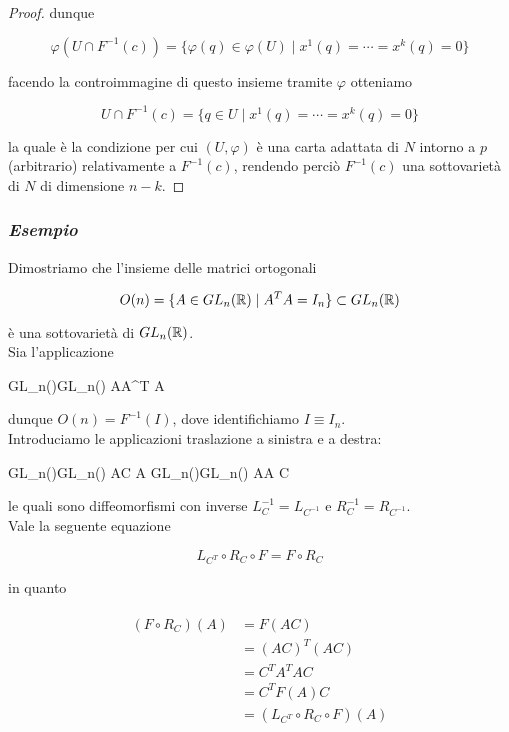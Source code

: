 \begin{proof}
	dunque
	
	\begin{equation}
		\varphi( U \cap F^{-1}(c) ) = \{ \varphi(q) \in \varphi(U) \mid x^{1}(q) = \cdots = x^{k}(q) = 0 \}
	\end{equation}

	facendo la controimmagine di questo insieme tramite $ \varphi $ otteniamo
	
	\begin{equation}
		U \cap F^{-1}(c) = \{ q \in U \mid x^{1}(q) = \cdots = x^{k}(q) = 0 \}
	\end{equation}

	la quale è la condizione per cui $ (U,\varphi) $ è una carta adattata di $ N $ intorno a $ p $ (arbitrario) relativamente a $ F^{-1}(c) $, rendendo perciò $ F^{-1}(c) $ una sottovarietà di $ N $ di dimensione $ n-k $.
\end{proof}

\subsubsection{\textit{Esempio}}

Dimostriamo che l'insieme delle matrici ortogonali

\begin{equation}
	O(n) = \{ A \in GL_{n}(\mathbb{R}) \mid A^{T} A = I_{n} \} \subset GL_{n}(\mathbb{R})
\end{equation}

è una sottovarietà di $ GL_{n}(\mathbb{R}) $. \\
Sia l'applicazione

	{GL_{n}(\R)}{GL_{n}(\R)}
	{A}{A^{T} A}

dunque $ O(n) = F^{-1}(I) $, dove identifichiamo $ I \equiv I_{n} $. \\
Introduciamo le applicazioni traslazione a sinistra e a destra:

	{GL_{n}(\R)}{GL_{n}(\R)}
	{A}{C A}
%
	{GL_{n}(\R)}{GL_{n}(\R)}
	{A}{A C}

le quali sono diffeomorfismi con inverse $ L_{C}^{-1} = L_{C^{-1}} $ e $ R_{C}^{-1} = R_{C^{-1}} $. \\
Vale la seguente equazione

\begin{equation}
	L_{C^{T}} \circ R_{C} \circ F = F \circ R_{C}
\end{equation}

in quanto

\begin{align}
	\begin{split}
		(F \circ R_{C})(A) &= F(AC) \\
		&= (AC)^{T} (AC) \\
		&= C^{T} A^{T} A C \\
		&= C^{T} F(A) C \\
		&= (L_{C^{T}} \circ R_{C} \circ F)(A)
	\end{split}
\end{align}

